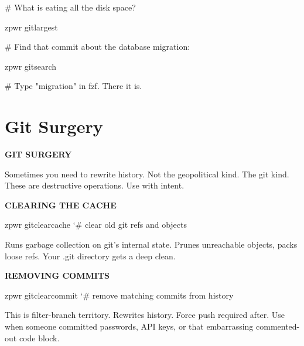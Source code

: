 \documentclass[11pt,a4paper,twoside]{book}
\begin{document}
\# What is eating all the disk space?

\begin{codebox}
\color{neongreen}zpwr gitlargest\\
\end{codebox}

\# Find that commit about the database migration:

\begin{codebox}
\color{neongreen}zpwr gitsearch\\
\end{codebox}

\# Type "migration" in fzf. There it is.


\vspace{16pt}

\section{Git Surgery}


\vspace{10pt}
{\large\bfseries\color{neoncyan} GIT SURGERY}\vspace{6pt}

Sometimes you need to rewrite history. Not the geopolitical kind. The git kind. These are destructive operations. Use with intent.


\vspace{12pt}
{\bfseries\color{neonyellow} CLEARING THE CACHE}\vspace{4pt}

\begin{codebox}
\color{neongreen}zpwr gitclearcache     {\char`\#} clear old git refs and objects\\
\end{codebox}

Runs garbage collection on git's internal state. Prunes unreachable objects, packs loose refs. Your .git directory gets a deep clean.


\vspace{12pt}
{\bfseries\color{neonyellow} REMOVING COMMITS}\vspace{4pt}

\begin{codebox}
\color{neongreen}zpwr gitclearcommit    {\char`\#} remove matching commits from history\\
\end{codebox}

This is filter-branch territory. Rewrites history. Force push required after. Use when someone committed passwords, API keys, or that embarrassing commented-out code block.
\end{document}
